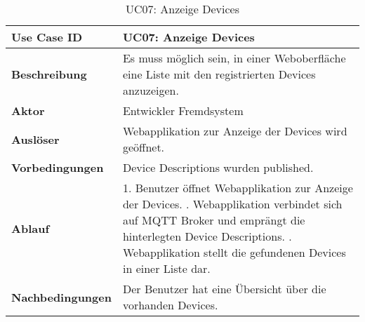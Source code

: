 \begin{table}[H]
\begin{tabularx}{\textwidth}{|l|X|}

 \hline
 {\bf Use Case ID }    & UC07: Anzeige Devices \\  \hline
 {\bf Beschreibung }   & Es muss möglich sein, in einer Weboberfläche eine Liste mit den registrierten Devices anzuzeigen. \\ \hline
 {\bf Aktor }          & Entwickler Fremdsystem \\ \hline
 {\bf Auslöser }       & Webapplikation zur Anzeige der Devices wird geöffnet. \\ \hline
 {\bf Vorbedingungen } & Device Descriptions wurden published. \\ \hline
 {\bf Ablauf }         & 
     1. Benutzer öffnet Webapplikation zur Anzeige der Devices. \newline
     2. Webapplikation verbindet sich auf MQTT Broker und emprängt die hinterlegten Device Descriptions. \newline
     3. Webapplikation stellt die gefundenen Devices in einer Liste dar. \\ \hline
 {\bf Nachbedingungen} & Der Benutzer hat eine Übersicht über die vorhanden Devices. \\ \hline
  
\end{tabularx}
\caption{UC07: Anzeige Devices}
\end{table}

